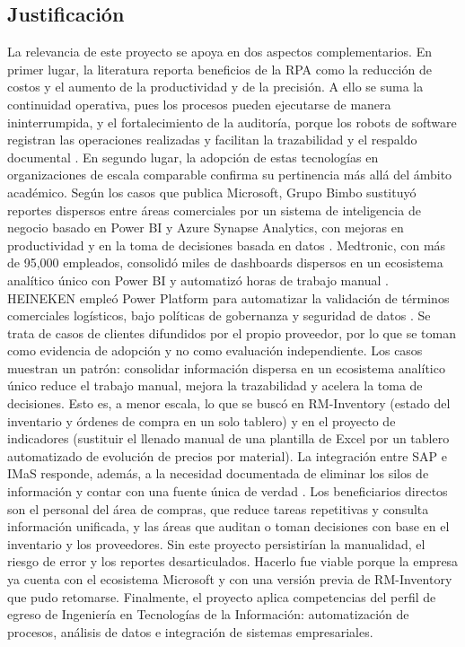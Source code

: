 \subsection{Justificación} \label{sec:justificacion} %

La relevancia de este proyecto se apoya en dos aspectos complementarios. En primer lugar, la literatura reporta beneficios de la RPA como la reducción de costos y el aumento de la productividad y de la precisión. A ello se suma la continuidad operativa, pues los procesos pueden ejecutarse de manera ininterrumpida, y el fortalecimiento de la auditoría, porque los robots de software registran las operaciones realizadas y facilitan la trazabilidad y el respaldo documental \cite{moreira2023rpa}.
En segundo lugar, la adopción de estas tecnologías en organizaciones de escala comparable confirma su pertinencia más allá del ámbito académico. Según los casos que publica Microsoft, Grupo Bimbo sustituyó reportes dispersos entre áreas comerciales por un sistema de inteligencia de negocio basado en Power BI y Azure Synapse Analytics, con mejoras en productividad y en la toma de decisiones basada en datos \cite{microsoft2025bimbo}. Medtronic, con más de 95,000 empleados, consolidó miles de dashboards dispersos en un ecosistema analítico único con Power BI y automatizó horas de trabajo manual \cite{microsoft2025medtronic}. HEINEKEN empleó Power Platform para automatizar la validación de términos comerciales logísticos, bajo políticas de gobernanza y seguridad de datos \cite{microsoft2025heineken}. Se trata de casos de clientes difundidos por el propio proveedor, por lo que se toman como evidencia de adopción y no como evaluación independiente.
Los casos muestran un patrón: consolidar información dispersa en un ecosistema analítico único reduce el trabajo manual, mejora la trazabilidad y acelera la toma de decisiones. Esto es, a menor escala, lo que se buscó en RM-Inventory (estado del inventario y órdenes de compra en un solo tablero) y en el proyecto de indicadores (sustituir el llenado manual de una plantilla de Excel por un tablero automatizado de evolución de precios por material). La integración entre SAP e IMaS responde, además, a la necesidad documentada de eliminar los silos de información y contar con una fuente única de verdad \cite{ibm2024erp, ibm2024erpIntegracion}.
Los beneficiarios directos son el personal del área de compras, que reduce tareas repetitivas y consulta información unificada, y las áreas que auditan o toman decisiones con base en el inventario y los proveedores. Sin este proyecto persistirían la manualidad, el riesgo de error y los reportes desarticulados. Hacerlo fue viable porque la empresa ya cuenta con el ecosistema Microsoft y con una versión previa de RM-Inventory que pudo retomarse. Finalmente, el proyecto aplica competencias del perfil de egreso de Ingeniería en Tecnologías de la Información: automatización de procesos, análisis de datos e integración de sistemas empresariales.

